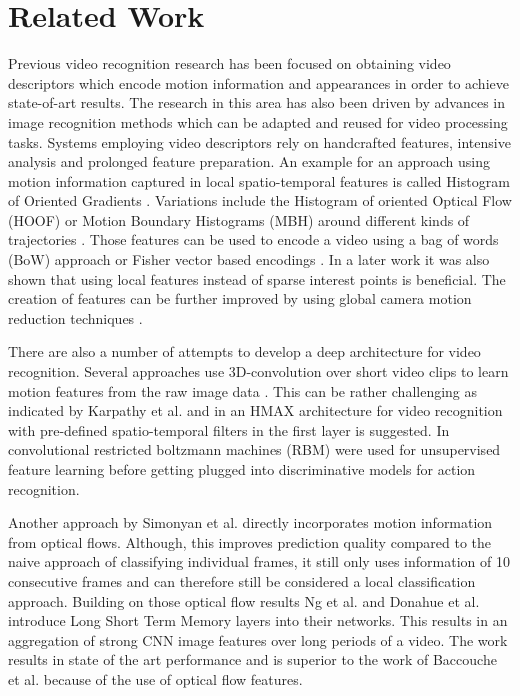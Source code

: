 \section{Related Work}
\label{sec:related}

Previous video recognition research has been focused on obtaining video descriptors which encode motion information and appearances in order to achieve state-of-art results. The research in this area has also been driven by advances in image recognition methods which can be adapted and reused for video processing tasks. Systems employing video descriptors rely on handcrafted features, intensive analysis and prolonged feature preparation. An example for an approach using motion information captured in local spatio-temporal features is called Histogram of Oriented Gradients \cite{dalal2005histograms}. Variations include the Histogram of oriented Optical Flow (HOOF) \cite{hoof} or Motion Boundary Histograms (MBH) \cite{dalal2006human} around different kinds of trajectories \cite{goodale1992separate}. Those features can be used to encode a video using a bag of words (BoW) approach \cite{laptev2008learning} or Fisher vector based encodings \cite{wang2013action}. In a later work \cite{wang2009evaluation} it was also shown that using local features instead of sparse interest points is beneficial. The creation of features can be further improved by using global camera motion reduction techniques \cite{jain2013better, kuehne2011hmdb, wang2013action}. 

There are also a number of attempts to develop a deep architecture for video recognition. Several approaches use 3D-convolution over short video clips to learn motion features from the raw image data \cite{baccouche2011sequential, ji20133d, karpathy2014large}. This can be rather challenging as indicated by Karpathy et al. \cite{karpathy2014large} and in \cite{jhuang2007biologically} an HMAX architecture for video recognition with pre-defined spatio-temporal filters in the first layer is suggested. In \cite{chen2010deep}\cite{le2011learning}\cite{taylor2010convolutional} convolutional restricted boltzmann machines (RBM) were used for unsupervised feature learning  before getting plugged into discriminative models for action recognition. 

Another approach by Simonyan et al. \cite{simonyan2014two} directly incorporates motion information from optical flows. Although, this improves prediction quality compared to the naive approach of classifying individual frames, it still only uses information of 10 consecutive frames and can therefore still be considered a local classification approach. Building on those optical flow results Ng et al. \cite{ng2015beyond} and Donahue et al. \cite{donahue2014long} introduce Long Short Term Memory layers into their networks. This results in an aggregation of strong CNN image features over long periods of a video. The work results in state of the art performance and is superior to the work of Baccouche et al. \cite{baccouche2010action} because of the use of optical flow features. 

